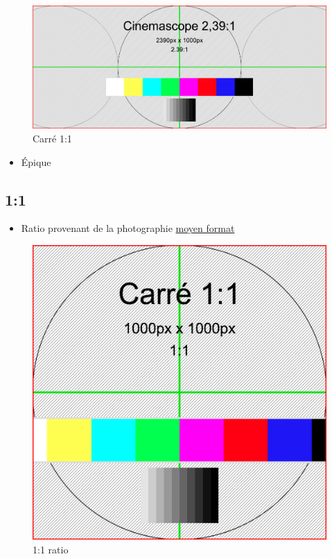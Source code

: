 \documentclass[
  french,
]{book}
\providecommand{\tightlist}{%
  \setlength{\itemsep}{0pt}\setlength{\parskip}{0pt}}
\begin{document}
\begin{figure}
\centering
\includegraphics{medias/lexique/Cinemascope_2_39_1_2390x1000.png}
\caption{Carré 1:1}
\end{figure}

\begin{itemize}
\tightlist
\item
  Épique
\end{itemize}

\hypertarget{section-5}{%
\subsection{1:1}\label{section-5}}

\begin{itemize}
\tightlist
\item
  Ratio provenant de la photographie \href{https://fr.wikipedia.org/wiki/Appareil_photographique_de_moyen_format}{moyen format}
\end{itemize}

\begin{figure}
\centering
\includegraphics{medias/lexique/carre_1_1_1000x1000.png}
\caption{1:1 ratio}
\end{figure}
\end{document}
